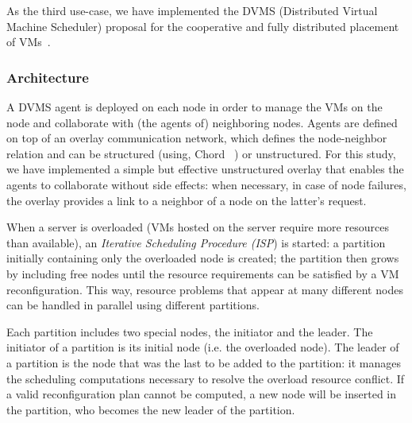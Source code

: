 As the third use-case, we have implemented the DVMS (Distributed
Virtual Machine Scheduler) proposal for the cooperative and fully
distributed placement of VMs~\cite{quesnel:cpe2012}.
%
%


\subsubsection{Architecture}

A DVMS agent is deployed on each node in order to manage the VMs on
the node and collaborate with (the agents of) neighboring nodes.
Agents are defined on top of an overlay communication network, which
defines the node-neighbor relation and can be structured (using, \eg
Chord ~\cite{stoica:2001:sigcomm01}) or unstructured. For this study,
we have implemented a simple but effective unstructured overlay that
enables the agents to collaborate without side effects: when
necessary, \eg in case of node failures, the overlay provides a link
to a neighbor of a node on the latter's request.

When a server is overloaded (\ie VMs hosted on the server require more
resources than available), an \emph{Iterative Scheduling Procedure
  (ISP}) is started: a partition initially containing only the
overloaded node is created; the partition then grows by including free
nodes until the resource requirements can be satisfied by a VM
reconfiguration. This way, resource problems that appear at many
different nodes can be handled in parallel using different
partitions.

Each partition includes two special nodes, the initiator and the
leader.  The initiator of a partition is its initial node (i.e. the
overloaded node).  The leader of a partition is the node that was the
last to be added to the partition: it manages the scheduling
computations necessary to resolve the overload resource conflict. If a
valid reconfiguration plan cannot be computed, a new node will be
inserted in the partition, who becomes the new leader of the
partition.


